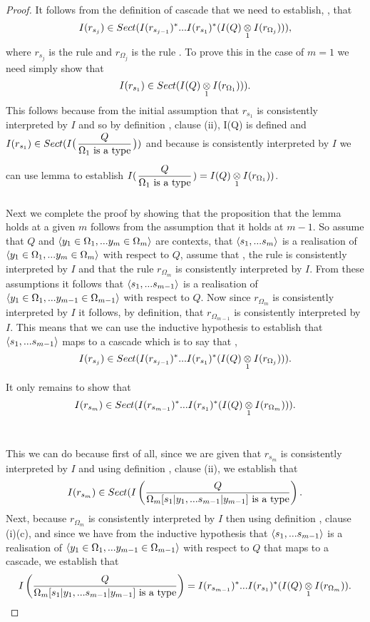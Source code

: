 \begin{proof}
It follows from the definition of cascade that we need to establish, \foreachj, that
 $$I(r_{s_j}) \in Sect(I(r_{s_{j-1}})^*...I(r_{s_1})^*(\crossx{I(Q)}{I(r_{\Omega_j})}{1})) ,$$
  where $r_{s_j}$ is the rule  and $r_{\Omega_j}$ is the rule .
To prove this in the case of $m=1$ we need simply show that 
 $$I(r_{s_1}) \in Sect(\crossx{I(Q)}{I(r_{\Omega_1})}{1})).$$
 This follows because from the initial assumption that $r_{s_1}$ is consistently interpreted by $I$ and so by definition , clause (ii),
 I(Q) is defined and  $I(r_{s_1}) \in Sect(I\big(\gatdisplayrule{Q}{\isT{\Omega_1}}\big))$ 
 and because  is consistently interpreted by $I$ we can use lemma  to establish $I(\gatdisplayrule{Q}{\isT{\Omega_1}}) = \crossx{I(Q)}{I(r_{\Omega_1})}{1})$.

Next we complete the proof by showing that the proposition that the lemma holds at a given $m$ follows from
the assumption that it holds at $m-1$. So assume that $Q$  and $\encyOmega{m}$ are contexts, 
that $\tuple{\sm}$ is a realisation of $\tuple{\yOmega{m}}$ with respect to $Q$,
assume that \foreachj, the rule  is consistently interpreted by $I$ 
and that the rule $r_{\Omega_m}$ is consistently interpreted by $I$. 
From these assumptions it follows
that  $\tuple{\sm[-1]}$ is a realisation of $\tuple{\yOmega{m-1}}$ with respect to $Q$.
Now since $r_{\Omega_m}$ is consistently interpreted by $I$ it follows, by definition,  that $r_{\Omega_{m-1}}$ is consistently interpreted by $I$. This means that we can use the inductive hypothesis to establish that $\tuple{\sm[-1]}$ maps to a cascade which is to say that \foreachj[m-1],  
$$I(r_{s_j}) \in Sect(I(r_{s_{j-1}})^*...I(r_{s_1})^*(\crossx{I(Q)}{I(r_{\Omega_j})}{1})).$$

It only remains to show that
$$I(r_{s_m}) \in Sect(I(r_{s_{m-1}})^*...I(r_{s_1})^*(\crossx{I(Q)}{I(r_{\Omega_m})}{1})).$$ \

This we can do because first of all, since we are given that $r_{s_m}$ is consistently interpreted by $I$ and using definition , clause (ii), we establish that
$$I(r_{s_m}) \in Sect(\Imappedrule{Q}{\isT{\Omega_m[\SUBsFORy{m-1}]}}.$$ 
Next, because $r_{\Omega_m}$ is consistently interpreted by $I$ then using definition , clause (i)(c), 
and since we have from the inductive hypothesis that $\tuple{\sm[-1]}$ is a realisation of $\tuple{\yOmega{m-1}}$ with respect to $Q$ that maps to a cascade,
we establish that
 $$\Imappedrule{Q}{\isT{\Omega_m[\SUBsFORy{m-1}]}}= I(r_{s_{m-1}})^*...I(r_{s_1})^*(\crossx{I(Q)}{I(r_{\Omega_m})}{1}).$$
 \end{proof}

